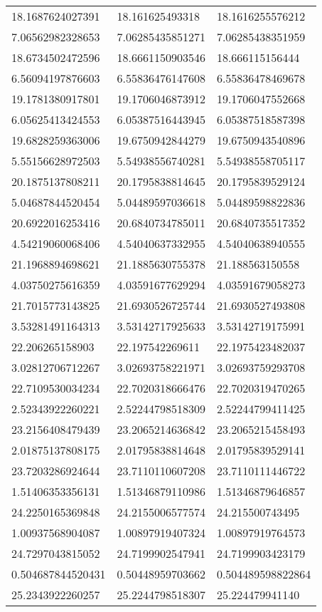 \documentclass[10pt,a4paper]{article}
\begin{document}
\begin{center}
\begin{longtable}{ |p{2.8cm}|p{2.8cm}|p{2.8cm}| }
    18.1687624027391  & 18.161625493318   & 18.1616255576212    \\
    7.06562982328653  & 7.06285435851271  & 7.06285438351959    \\
    18.6734502472596  & 18.6661150903546  & 18.666115156444     \\
    6.56094197876603  & 6.55836476147608  & 6.55836478469678    \\
    19.1781380917801  & 19.1706046873912  & 19.1706047552668    \\
    6.05625413424553  & 6.05387516443945  & 6.05387518587398    \\
    19.6828259363006  & 19.6750942844279  & 19.6750943540896    \\
    5.55156628972503  & 5.54938556740281  & 5.54938558705117    \\
    20.1875137808211  & 20.1795838814645  & 20.1795839529124    \\
    5.04687844520454  & 5.04489597036618  & 5.04489598822836    \\
    20.6922016253416  & 20.6840734785011  & 20.6840735517352    \\
    4.54219060068406  & 4.54040637332955  & 4.54040638940555    \\
    21.1968894698621  & 21.1885630755378  & 21.188563150558     \\
    4.03750275616359  & 4.03591677629294  & 4.03591679058273    \\
    21.7015773143825  & 21.6930526725744  & 21.6930527493808    \\
    3.53281491164313  & 3.53142717925633  & 3.53142719175991    \\
    22.206265158903   & 22.197542269611   & 22.1975423482037    \\
    3.02812706712267  & 3.02693758221971  & 3.02693759293708    \\
    22.7109530034234  & 22.7020318666476  & 22.7020319470265    \\
    2.52343922260221  & 2.52244798518309  & 2.52244799411425    \\
    23.2156408479439  & 23.2065214636842  & 23.2065215458493    \\
    2.01875137808175  & 2.01795838814648  & 2.01795839529141    \\
    23.7203286924644  & 23.7110110607208  & 23.7110111446722    \\
    1.51406353356131  & 1.51346879110986  & 1.51346879646857    \\
    24.2250165369848  & 24.2155006577574  & 24.215500743495     \\
    1.00937568904087  & 1.00897919407324  & 1.00897919764573    \\
    24.7297043815052  & 24.7199902547941  & 24.7199903423179    \\
    0.504687844520431 & 0.50448959703662  & 0.504489598822864   \\
    25.2343922260257  & 25.2244798518307  & 25.224479941140     \\
    \hline
  \end{longtable}
\end{center}
\end{document}
